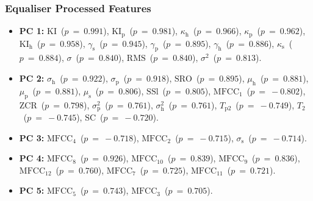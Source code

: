 		\subsubsection*{Equaliser Processed Features}
			\begin{itemize}
				\item {\bf{PC 1:}} $\textrm{KI}$~($p~=~0.991$), $\textrm{KI}_{\textrm{p}}$~($p~=~0.981$),
					$\kappa_{\textrm{h}}$~($p~=~0.966$), $\kappa_{\textrm{p}}$~($p~=~0.962$),
					$\textrm{KI}_{\textrm{h}}$~($p~=~0.958$), $\gamma_{\textrm{s}}$~($p~=~0.945$),
					$\gamma_{\textrm{p}}$~($p~=~0.895$), $\gamma_{\textrm{h}}$~($p~=~0.886$),
					$\kappa_{\textrm{s}}$~($p~=~0.884$), $\sigma$~($p~=~0.840$),
					$\textrm{RMS}$~($p~=~0.840$), $\sigma^{2}$~($p~=~0.813$).
				\item {\bf{PC 2:}} $\sigma_{\textrm{h}}$~($p~=~ 0.922$), $\sigma_{\textrm{p}}$~($p~=~
					0.918$), $\textrm{SRO}$~($p~=~ 0.895$), $\mu_{\textrm{h}}$~($p~=~ 0.881$),
					$\mu_{\textrm{p}}$~($p~=~ 0.881$), $\mu_{\textrm{s}}$~($p~=~ 0.806$),
					$\textrm{SSl}$~($p~=~ 0.805$), $\textrm{MFCC}_{1}$~($p~=~-0.802$),
					$\textrm{ZCR}$~($p~=~ 0.798$), $\sigma_{\textrm{p}}^{2}$~($p~=~ 0.761$),
					$\sigma_{\textrm{h}}^{2}$~($p~=~ 0.761$), $T_{\textrm{p}2}$~($p~=~-0.749$),
					$T_{2}$~($p~=~-0.745$), $\textrm{SC}$~($p~=~-0.720$).
				\item {\bf{PC 3:}} $\textrm{MFCC}_{4}$~($p~=~-0.718$), $\textrm{MFCC}_{2}$~($p~=~-0.715$),
					$\sigma_{\textrm{s}}$~($p~=~-0.714$).
				\item {\bf{PC 4:}} $\textrm{MFCC}_{8}$~($p~=~0.926$), $\textrm{MFCC}_{10}$~($p~=~0.839$),
					$\textrm{MFCC}_{9}$~($p~=~0.836$), $\textrm{MFCC}_{12}$~($p~=~0.760$),
					$\textrm{MFCC}_{7}$~($p~=~0.725$), $\textrm{MFCC}_{11}$~($p~=~0.721$).
				\item {\bf{PC 5:}} $\textrm{MFCC}_{5}$~($p~=~0.743$), $\textrm{MFCC}_{3}$~($p~=~0.705$).
			\end{itemize}

